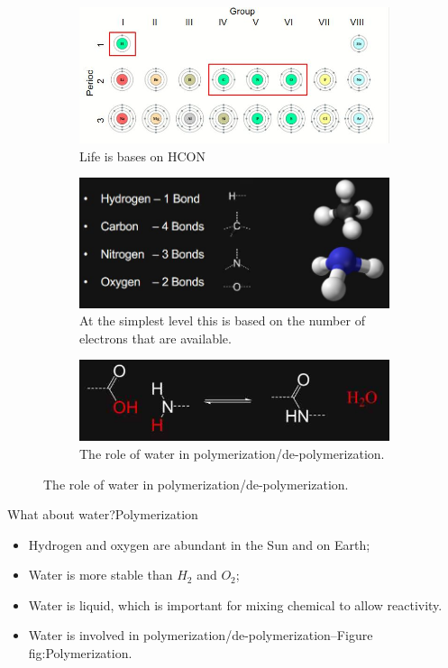 \documentclass[]{article}
\begin{document}
\begin{figure}[H]
	\caption{how these elements behave at the electronic level}
	\begin{subfigure}[t]{0.5\textwidth}
		\caption{Life is bases on HCON}\label{fig:Behaviour1}
		\includegraphics[width=\textwidth]{Behaviour1}
	\end{subfigure}
	\begin{subfigure}[t]{0.4\textwidth}
		\caption{At the simplest level this is based on the number of electrons that are available.}\label{fig:Behaviour2}
		\includegraphics[width=\textwidth]{Behaviour2}
	\end{subfigure}
	\begin{subfigure}[t]{1.0\textwidth}
	\caption{The role of water in polymerization/de-polymerization.}\label{fig:Polymerization}
	\includegraphics[width=\textwidth]{Polymerization}
\end{subfigure}
\end{figure}

What about water?Polymerization
\begin{itemize}
	\item Hydrogen and oxygen are abundant in the Sun and on Earth;
	\item Water is more stable than $H_2$ and $O_2$;
	\item Water is liquid, which is important for mixing chemical to allow reactivity.
	\item Water is involved in polymerization/de-polymerization--Figure {fig:Polymerization}.
\end{itemize}
	
\end{document}
